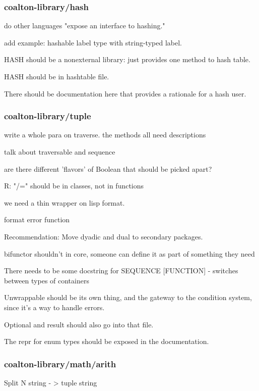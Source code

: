 \documentclass[12pt]{article}
\begin{document}
\subsubsection{coalton-library/hash}

do other languages "expose an interface to hashing."

add example: hashable label type with string-typed label.

HASH should be a nonexternal library: just provides one method to hash table.

HASH should be in hashtable file.

There should be documentation here that provides a rationale for a hash user.

\subsubsection{coalton-library/tuple}

write a whole para on traverse. the methods all need descriptions

talk about traversable and sequence


are there different 'flavors' of Boolean that should be picked apart?

R: "/=" should be in classes, not in functions

we need a thin wrapper on lisp format.

format error function

Recommendation: Move dyadic and dual to secondary packages.

bifunctor shouldn't in core, someone can define it as part of
      something they need

There needs to be some docstring for SEQUENCE [FUNCTION] - switches between types of containers

Unwrappable should be its own thing, and the gateway to the condition
system, since it's a way to handle errors.

Optional and result should also go into that file.

The repr for enum types should be exposed in the documentation.

\subsubsection{coalton-library/math/arith}

Split N string - > tuple string
\end{document}
